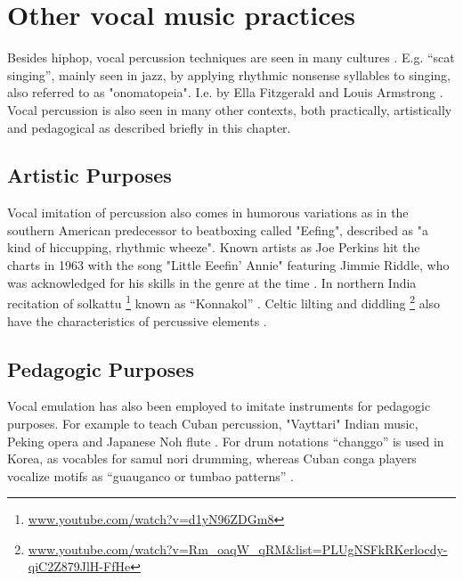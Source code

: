 \section{Other vocal music practices}

Besides hiphop, vocal percussion techniques are seen in many cultures \citep{Sinyor05}. E.g. “scat singing”, mainly seen in jazz, by applying rhythmic nonsense syllables to singing, also referred to as "onomatopeia". I.e. by Ella Fitzgerald and Louis Armstrong \citep{Janer_syllablingon}. Vocal percussion is also seen in many other contexts, both practically, artistically and pedagogical as described briefly in this chapter.
\subsection{ Artistic Purposes}
Vocal imitation of percussion also comes in humorous variations as in the southern American predecessor to beatboxing called "Eefing", described as "a kind of hiccupping, rhythmic wheeze". Known artists as Joe Perkins hit the charts in 1963 with the song "Little Eeefin' Annie" featuring Jimmie Riddle, who was acknowledged for his skills in the genre at the time \citep{jennifersharpe2006}. In northern India recitation of solkattu \footnote{\url{ www.youtube.com/watch?v=d1yN96ZDGm8}} known as “Konnakol” \citep{proctor2012}. Celtic lilting and diddling \footnote{\url{www.youtube.com/watch?v=Rm_oaqW_qRM&list=PLUgNSFkRKerlocdy-qiC2Z879JlH-FfHe}} also have the characteristics of percussive elements \citep{proctor2012}.
\subsection{ Pedagogic Purposes}
Vocal emulation has also been employed to imitate instruments for pedagogic purposes. For example to teach Cuban percussion, "Vayttari" Indian music, Peking opera and Japanese Noh flute \citep{Janer_syllablingon}. For drum notations “changgo” is used in Korea, as vocables for samul nori drumming, whereas Cuban conga players vocalize motifs as “guauganco or tumbao patterns” \citep{proctor2012}.
